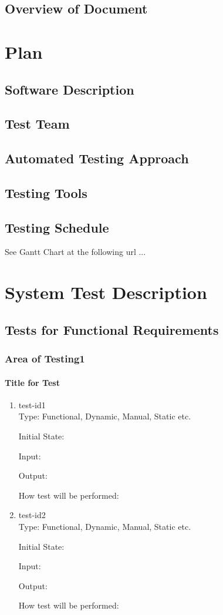 \documentclass[12pt, titlepage]{article}
\begin{document}
\subsection{Overview of Document}
\section{Plan}
	
\subsection{Software Description}
\subsection{Test Team}
\subsection{Automated Testing Approach}
\subsection{Testing Tools}
\subsection{Testing Schedule}
		
See Gantt Chart at the following url ...
\section{System Test Description}
	
\subsection{Tests for Functional Requirements}
\subsubsection{Area of Testing1}
		
\paragraph{Title for Test}
\begin{enumerate}
\item{test-id1\\}
Type: Functional, Dynamic, Manual, Static etc.
					
Initial State: 
					
Input: 
					
Output: 
					
How test will be performed: 
					
\item{test-id2\\}
Type: Functional, Dynamic, Manual, Static etc.
					
Initial State: 
					
Input: 
					
Output: 
					
How test will be performed: 
\end{enumerate}
\end{document}
